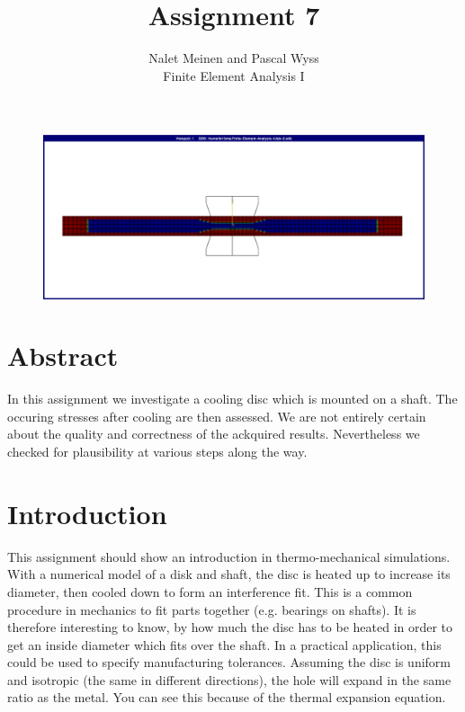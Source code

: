 \documentclass[12pt]{article}
\begin{document}


\title{Assignment 7}%
\author{Nalet Meinen and Pascal Wyss\\ %
Finite Element Analysis I
}
\maketitle

\begin{figure}[!htb]
  \centering
  \vspace*{1cm}
  \includegraphics[trim={-3cm 2cm 2cm 2cm},clip,width=1.0\linewidth]{pics/titelbild}
  \label{fig:0}
\end{figure}

\newpage

\section*{Abstract}
In this assignment we investigate a cooling disc which is mounted on a shaft.
The occuring stresses after cooling are then assessed.
We are not entirely certain about the quality and correctness
of the ackquired results. Nevertheless we checked for plausibility at various steps
along the way.

\tableofcontents
\pagebreak
\section{Introduction}

This assignment should show an introduction in thermo-mechanical simulations. With a numerical model of a disk and shaft,  the disc is heated up to increase its diameter, then cooled down to form an interference fit. This is a common procedure in mechanics to fit parts together (e.g. bearings on shafts). It is therefore interesting to know, by how much the disc has to be heated in order to get an inside diameter which fits over the shaft. In a practical application, this could be used to specify manufacturing tolerances.
Assuming the disc is uniform and isotropic (the same in different directions), the hole will expand in the same ratio as the metal. You can see this because of the thermal expansion equation.
\end{document}
